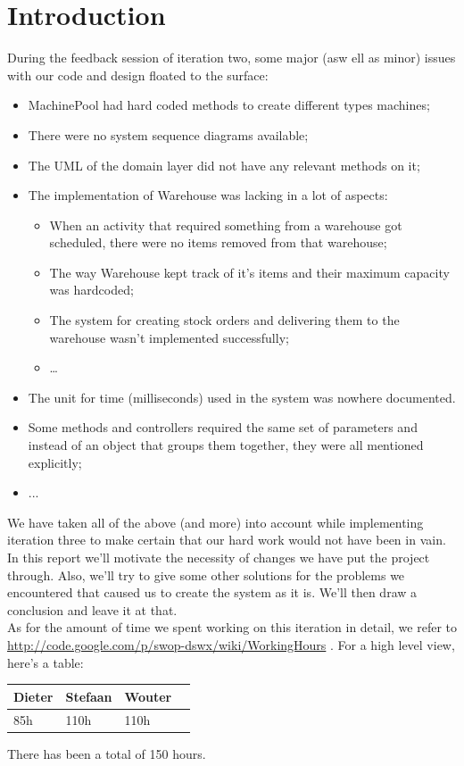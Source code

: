 \documentclass[12pt]{article}
\begin{document}
\section{Introduction}
During the feedback session of iteration two, some major (asw ell as minor) issues with our code and design floated to the surface:
\begin{itemize}
\item{MachinePool had hard coded methods to create different types machines;}
\item{There were no system sequence diagrams available;}
\item{The UML of the domain layer did not have any relevant methods on it;}
\item{The implementation of Warehouse was lacking in a lot of aspects: }
\begin{itemize}
\item{When an activity that required something from a warehouse got scheduled, there were no items removed from that warehouse;}
\item{The way Warehouse kept track of it's items and their maximum capacity was hardcoded;}
\item{The system for creating stock orders and delivering them to the warehouse wasn't implemented successfully;}
\item{\dots}
\end{itemize}
\item{The unit for time (milliseconds) used in the system was nowhere documented.}
\item{Some methods and controllers required the same set of parameters and instead of an object that groups them together, they were all mentioned explicitly;}
\item{...}
\end{itemize}
We have taken all of the above (and more) into account while implementing iteration three to make certain that our hard work would not have been in vain.
In this report we'll motivate the necessity of changes we have put the project through. Also, we'll try to give some other solutions for the problems we encountered that caused us to create the system as it is. We'll then draw a conclusion and leave it at that. \\
\newline As for the amount of time we spent working on this iteration in detail, we refer to \url{http://code.google.com/p/swop-dswx/wiki/WorkingHours} . For a high level view, here's a table:
\begin{center}
    \begin{tabular}{ | l | l | l | p{100mm} |}
    \hline
    Dieter & Stefaan & Wouter\\ \hline
    85h & 110h & 110h\\
    \hline
    \end{tabular}
\end{center}
There has been a total of 150 hours.
\end{document}
